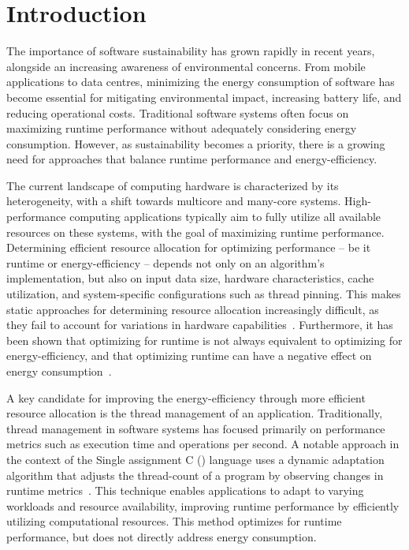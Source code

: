 
\section{Introduction}

The importance of software sustainability has grown rapidly in recent years, alongside an increasing awareness of environmental concerns.
From mobile applications to data centres, minimizing the energy consumption of software has become essential for mitigating environmental impact, increasing battery life, and reducing operational costs.
Traditional software systems often focus on maximizing runtime performance without adequately considering energy consumption.
However, as sustainability becomes a priority, there is a growing need for approaches that balance runtime performance and energy-efficiency.

The current landscape of computing hardware is characterized by its heterogeneity, with a shift towards multicore and many-core systems.
High-perfor\-mance computing applications typically aim to fully utilize all available resources on these systems, with the goal of maximizing runtime performance.
Determining efficient resource allocation for optimizing performance -- be it runtime or energy-efficiency -- depends not only on an algorithm's implementation, but also on input data size, hardware characteristics, cache utilization, and system-specific configurations such as thread pinning.
This makes static approaches for determining resource allocation increasingly difficult, as they fail to account for variations in hardware capabilities~\cite{heterogeneous-systems}.
Furthermore, it has been shown that optimizing for runtime is not always equivalent to optimizing for energy-efficiency, and that optimizing runtime can have a negative effect on energy consumption~\cite{compiler-energy-android,compiler-energy-differences}.

A key candidate for improving the energy-efficiency through more efficient resource allocation is the thread management of an application.
Traditionally, thread management in software systems has focused primarily on performance metrics such as execution time and operations per second.
A notable approach in the context of the Single assignment C (\sac{}) language uses a dynamic adaptation algorithm that adjusts the thread-count of a program by observing changes in runtime metrics~\cite{sac-mtdynamic}.
This technique enables \sac{} applications to adapt to varying workloads and resource availability, improving runtime performance by efficiently utilizing computational resources.
This method optimizes for runtime performance, but does not directly address energy consumption.

